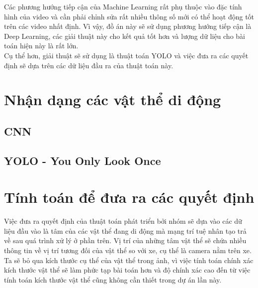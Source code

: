\documentclass[a4paper,10pt]{article}
\begin{document}
Các phương hướng tiếp cận của Machine Learning rất phụ thuộc vào đặc tính hình của video và cần phải chỉnh sửa rất nhiều thông số mới có thể hoạt động tốt trên các video nhất định. Vì vậy, đồ án này sẽ sử dụng phương hướng tiếp cận là Deep Learning, các giải thuật này cho kết quả tốt hơn và lượng dữ liệu cho bài toán hiện này là rất lớn.
\\
Cụ thể hơn, giải thuật sẽ sử dụng là thuật toán YOLO và việc đưa ra các quyết định sẽ dựa trên các dữ liệu đầu ra của thuật toán này.

\section{Nhận dạng các vật thể di động}
    \subsection{CNN}
	\subsection{YOLO - You Only Look Once}
\section{Tính toán để đưa ra các quyết định}
	Việc đưa ra quyết định của thuật toán phát triển bởi nhóm sẽ dựa vào các dữ liệu đầu vào là tâm của các vật thể đang di động mà mạng trí tuệ nhân tạo trả về sau quá trình xử lý ở phần trên. Vị trí của những tâm vật thể sẽ chứa nhiều thông tin về vị trí tương đối của vật thể so với xe, cụ thể là camera nằm trên xe. Ta sẽ bỏ qua kích thước cụ thể của vật thể trong ảnh, vì việc tính toán chính xác kích thước vật thể sẽ làm phức tạp bài toán hơn và độ chính xác cao đến từ việc tính toán kích thước vật thể cũng không cần thiết trong dự án lần này.
\end{document}
